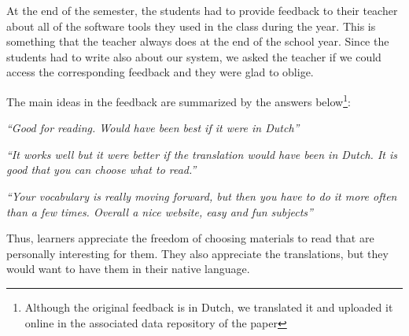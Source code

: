 

At the end of the semester, the students had to provide feedback to their teacher about all of the software tools they used in the class during the year. This is something that the teacher always does at the end of the school year. Since the students had to write also about our system, we asked the teacher if we could access the corresponding feedback and they were glad to oblige. 

The main ideas in the feedback are summarized by the answers below\footnote{Although the original feedback is in Dutch, we translated it and uploaded it online in the associated data repository of the paper}: 

\begin{description}
  \item {\em ``Good for reading. Would have been best if it were in Dutch''}
  \item {\em ``It works well but it were better if the translation would have been in Dutch. It is good that you can choose what to read.''}
  \item {\em ``Your vocabulary is really moving forward, but then you have to do it more often than a few times. Overall a nice website, easy and fun subjects''}
\end{description}

Thus, learners appreciate the freedom of choosing materials to read that are personally interesting for them. They also appreciate the translations, but they would want to have them in their native language. 



